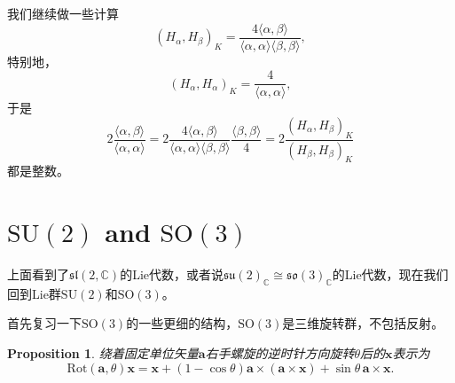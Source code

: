 \documentclass[9pt]{extbook}
\theoremstyle{plain}
\newtheorem{pro}[defi]{Proposition}
\newtheorem{theo}[defi]{Theorem}
\newcommand{\cc}{\mathbb{C}}
\newcommand{\lag}{{\mathfrak{g}}}  %
\begin{document}
我们继续做一些计算
\[
(H_\alpha,H_\beta)_K=\frac{4\langle \alpha,\beta \rangle}{\langle \alpha,\alpha \rangle\langle \beta,\beta \rangle},
\]
特别地，
\[
(H_\alpha,H_\alpha)_K=\frac{4}{\langle \alpha,\alpha \rangle},
\]
于是
\[
	2\frac{\langle \alpha,\beta \rangle}{\langle \alpha,\alpha \rangle}=2\frac{4\langle \alpha,\beta \rangle}{\langle \alpha,\alpha \rangle\langle \beta,\beta \rangle}\frac{\langle \beta,\beta \rangle}{4}=2\frac{(H_\alpha,H_\beta)_K}{(H_\beta,H_\beta)_K}
\]
都是整数。

\section{$\mathrm{SU}(2)$ and $\mathrm{SO}(3)$}
上面看到了$\mathfrak{sl}(2,\mathbb{C})$的Lie代数，或者说$\mathfrak{su}(2)_\cc\cong\mathfrak{so}(3)_\cc$的Lie代数，现在我们回到Lie群$\mathrm{SU}(2)$和$\mathrm{SO}(3)$。

首先复习一下$\mathrm{SO}(3)$的一些更细的结构，$\mathrm{SO}(3)$是三维旋转群，不包括反射。

\begin{pro}
绕着固定单位矢量$\mathbf{a}$右手螺旋的逆时针方向旋转$\theta$后的$\mathbf{x}$表示为
\[
\mathrm{Rot}(\mathbf{a},\theta)\mathbf{x}=\mathbf{x}+(1-\cos\theta)\mathbf{a}\times(\mathbf{a}\times\mathbf{x})+
\sin\theta\,\mathbf{a}\times\mathbf{x}.
\]
\end{pro}
\end{document}
